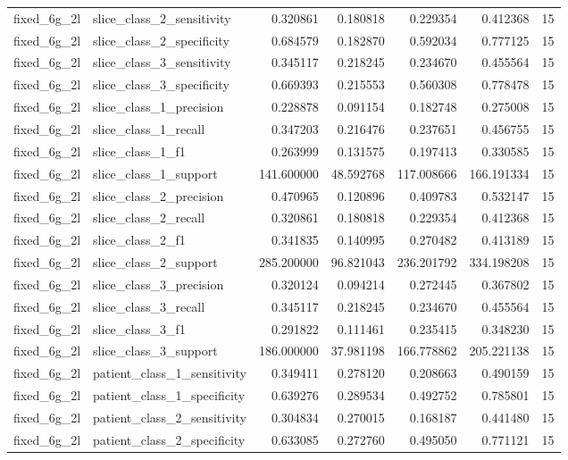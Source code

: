 \begin{tabular}{llrrrrr}
fixed_6g_2l & slice_class_2_sensitivity & 0.320861 & 0.180818 & 0.229354 & 0.412368 & 15 \\
fixed_6g_2l & slice_class_2_specificity & 0.684579 & 0.182870 & 0.592034 & 0.777125 & 15 \\
fixed_6g_2l & slice_class_3_sensitivity & 0.345117 & 0.218245 & 0.234670 & 0.455564 & 15 \\
fixed_6g_2l & slice_class_3_specificity & 0.669393 & 0.215553 & 0.560308 & 0.778478 & 15 \\
fixed_6g_2l & slice_class_1_precision & 0.228878 & 0.091154 & 0.182748 & 0.275008 & 15 \\
fixed_6g_2l & slice_class_1_recall & 0.347203 & 0.216476 & 0.237651 & 0.456755 & 15 \\
fixed_6g_2l & slice_class_1_f1 & 0.263999 & 0.131575 & 0.197413 & 0.330585 & 15 \\
fixed_6g_2l & slice_class_1_support & 141.600000 & 48.592768 & 117.008666 & 166.191334 & 15 \\
fixed_6g_2l & slice_class_2_precision & 0.470965 & 0.120896 & 0.409783 & 0.532147 & 15 \\
fixed_6g_2l & slice_class_2_recall & 0.320861 & 0.180818 & 0.229354 & 0.412368 & 15 \\
fixed_6g_2l & slice_class_2_f1 & 0.341835 & 0.140995 & 0.270482 & 0.413189 & 15 \\
fixed_6g_2l & slice_class_2_support & 285.200000 & 96.821043 & 236.201792 & 334.198208 & 15 \\
fixed_6g_2l & slice_class_3_precision & 0.320124 & 0.094214 & 0.272445 & 0.367802 & 15 \\
fixed_6g_2l & slice_class_3_recall & 0.345117 & 0.218245 & 0.234670 & 0.455564 & 15 \\
fixed_6g_2l & slice_class_3_f1 & 0.291822 & 0.111461 & 0.235415 & 0.348230 & 15 \\
fixed_6g_2l & slice_class_3_support & 186.000000 & 37.981198 & 166.778862 & 205.221138 & 15 \\
fixed_6g_2l & patient_class_1_sensitivity & 0.349411 & 0.278120 & 0.208663 & 0.490159 & 15 \\
fixed_6g_2l & patient_class_1_specificity & 0.639276 & 0.289534 & 0.492752 & 0.785801 & 15 \\
fixed_6g_2l & patient_class_2_sensitivity & 0.304834 & 0.270015 & 0.168187 & 0.441480 & 15 \\
fixed_6g_2l & patient_class_2_specificity & 0.633085 & 0.272760 & 0.495050 & 0.771121 & 15 \\

\end{tabular}
